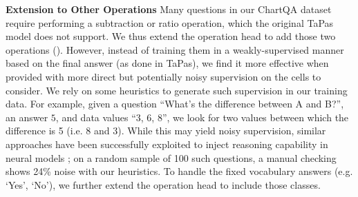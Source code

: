 \vspace{0.5em}
\noindent \textbf{Extension to Other Operations} Many questions in our ChartQA dataset require performing a subtraction or ratio operation, which the original TaPas model does not support. We thus extend the operation head to add those two operations (). However, instead of training them in a weakly-supervised manner based on the final answer (as done in TaPas), we find it more effective when provided with more direct but potentially noisy supervision on the cells to consider. We rely on some heuristics to generate such supervision in our training data. For example, given a question ``What's the difference between A and B?'', an answer $5$, and data values ``3, 6, 8'', we look for two values between which the difference is 5 (i.e. 8 and 3). While this may yield noisy supervision, similar approaches have been successfully exploited to inject reasoning capability in neural models \cite{geva-etal-2020-injecting,saxton2018analysing}; on a random sample of 100 such questions, a manual checking shows 24\% noise  with our heuristics. To handle the fixed vocabulary answers (e.g. `Yes', `No'), we further extend the operation head to include those classes.
